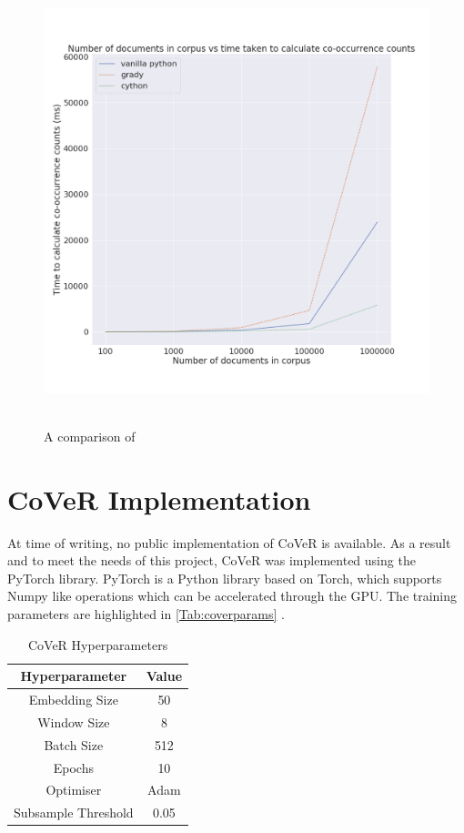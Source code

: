 \begin{figure}[ht]
	\includegraphics[width=13cm, height=13cm]{./figures/fig15}
	\centering
	\caption[Co-occurrence benchmarks]{A comparison of  }
	\label{fig:fig15}
\end{figure}

\noindent
\newline
\section{CoVeR Implementation}
At time of writing, no public implementation of CoVeR is available. As a result and to meet the needs of this project, CoVeR was implemented using the PyTorch library. PyTorch is a Python library based on Torch, which supports Numpy like operations which can be accelerated through the GPU. The training parameters are highlighted in \autoref{Tab:coverparams} .
\begin{table}[h!]
	\centering
	\begin{tabular}{||c | c||} 
		\hline
		Hyperparameter & Value \\ [0.5ex] 
		\hline\hline
		Embedding Size & 50 \\ 
		Window Size & 8 \\
		Batch Size & 512 \\
		Epochs & 10 \\
		Optimiser & Adam \\
		Subsample Threshold & 0.05 \\
		\hline
	\end{tabular}
	\label{Tab:coverparams}
	\caption[CoVeR Hyperparameters]{CoVeR Hyperparameters}
\end{table}
